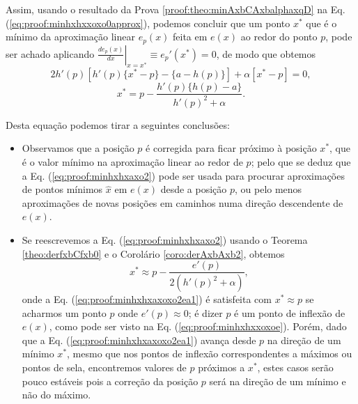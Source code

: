 \begin{myproofT}
Assim, usando o resultado da Prova \ref{proof:theo:minAxbCAxbalphaxqD} na Eq. (\ref{eq:proof:minhxhxxoxo0approx}), 
podemos concluir que um ponto $x^*$ que é 
o mínimo da aproximação linear $e_p(x)$ feita em $e(x)$ ao redor do ponto $p$,
pode ser achado aplicando $\left. \frac{d e_p(x)}{d x }\right|_{x=x^*} \equiv e_{p}'(x^*) =0$,
de modo que obtemos
\begin{equation}\label{eq:proof:minhxhxaxo2a}
 2 h'(p)[h'(p)\{x^*-p\} -\{a-h(p)\}] + \alpha [x^*-p] = 0,
\end{equation} 
\begin{equation}\label{eq:proof:minhxhxaxo2}
x^* = p - \frac{h'(p)\{h(p)-a\}}{ h'(p)^2+\alpha}.
\end{equation} 








Desta equação podemos tirar a seguintes conclusões:
\begin{itemize}

\item Observamos que a posição $p$ é corregida para ficar próximo à posição $x^*$, 
que é o valor mínimo na aproximação linear ao redor de $p$;
pelo que se deduz que a Eq. (\ref{eq:proof:minhxhxaxo2})
pode ser usada para procurar aproximações de pontos mínimos $\hat{x}$ em $e(x)$ desde a posição $p$,
ou pelo menos aproximações de novas posições em caminhos numa direção descendente de $e(x)$.

\item Se reescrevemos a Eq. (\ref{eq:proof:minhxhxaxo2}) usando o Teorema \ref{theo:derfxbCfxb0}
e o Corolário \ref{coro:derAxbAxb2},
obtemos
\begin{equation}\label{eq:proof:minhxhxaxoxo2ea1}
x^* \approx p - \frac{ e'(p)}{2(h'(p)^2+\alpha)},
\end{equation}
onde a Eq. (\ref{eq:proof:minhxhxaxoxo2ea1}) é satisfeita 
com $x^* \approx p$
se acharmos um  ponto $p$ onde  
$e'(p)\approx 0$; 
é dizer $p$ é um ponto de inflexão de $e(x)$, como pode ser visto na Eq. (\ref{eq:proof:minhxhxxoxoe}).
Porém, dado que a Eq. (\ref{eq:proof:minhxhxaxoxo2ea1}) avança desde $p$ na direção de um mínimo $x^*$, 
mesmo que nos pontos de inflexão correspondentes a máximos ou pontos de sela,
encontremos valores de $p$ próximos a $x^*$,
 estes casos serão pouco estáveis pois
a correção da posição $p$ será na direção de um mínimo e não do máximo.


\end{itemize}
\end{myproofT}
